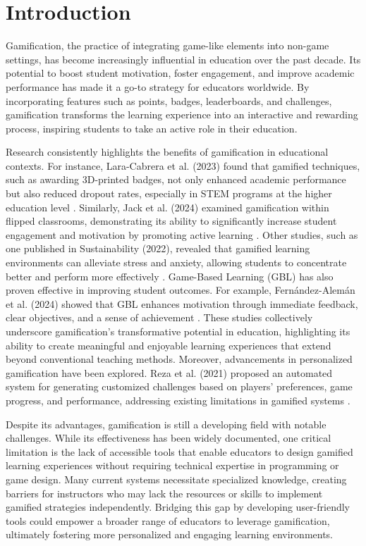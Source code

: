 \chapter{Introduction}
\label{chap:intro}
Gamification, the practice of integrating game-like elements into non-game settings, has become increasingly influential in education over the past decade. Its potential to boost student motivation, foster engagement, and improve academic performance has made it a go-to strategy for educators worldwide. By incorporating features such as points, badges, leaderboards, and challenges, gamification transforms the learning experience into an interactive and rewarding process, inspiring students to take an active role in their education.

Research consistently highlights the benefits of gamification in educational contexts. For instance, Lara-Cabrera et al. (2023) found that gamified techniques, such as awarding 3D-printed badges, not only enhanced academic performance but also reduced dropout rates, especially in STEM programs at the higher education level \cite{lara2023badges}. Similarly, Jack et al. (2024) examined gamification within flipped classrooms, demonstrating its ability to significantly increase student engagement and motivation by promoting active learning \cite{jack2024gamification}. Other studies, such as one published in Sustainability (2022), revealed that gamified learning environments can alleviate stress and anxiety, allowing students to concentrate better and perform more effectively \cite{sustainability2022gamification}. Game-Based Learning (GBL) has also proven effective in improving student outcomes. For example, Fernández-Alemán et al. (2024) showed that GBL enhances motivation through immediate feedback, clear objectives, and a sense of achievement \cite{fernando2024}. These studies collectively underscore gamification’s transformative potential in education, highlighting its ability to create meaningful and enjoyable learning experiences that extend beyond conventional teaching methods. Moreover, advancements in personalized gamification have been explored. Reza et al. (2021) proposed an automated system for generating customized challenges based on players’ preferences, game progress, and performance, addressing existing limitations in gamified systems \cite{khoshkangini2021}.

Despite its advantages, gamification is still a developing field with notable challenges. While its effectiveness has been widely documented, one critical limitation is the lack of accessible tools that enable educators to design gamified learning experiences without requiring technical expertise in programming or game design. Many current systems necessitate specialized knowledge, creating barriers for instructors who may lack the resources or skills to implement gamified strategies independently. Bridging this gap by developing user-friendly tools could empower a broader range of educators to leverage gamification, ultimately fostering more personalized and engaging learning environments.